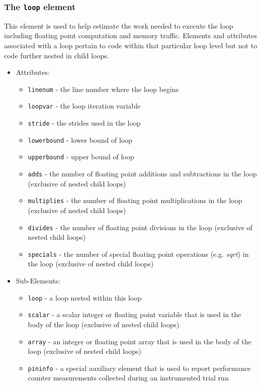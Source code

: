 \documentclass{article}
\begin{document}
\subsubsection{The {\tt loop} element}
  This element is used to help estimate the work needed to execute the
  loop including floating point computation and memory traffic.  Elements
  and attributes associated with a loop pertain to code within that
  particular loop level but not to code further nested in child loops.
  \begin{itemize}
    \item Attributes:
    \begin{itemize}
      \item {\tt linenum} - the line number where the loop begins
      \item {\tt loopvar} - the loop iteration variable
      \item {\tt stride} - the strides used in the loop
      \item {\tt lowerbound} - lower bound of loop
      \item {\tt upperbound} - upper bound of loop
      \item {\tt adds} - the number of floating point additions and
        subtractions in the loop (exclusive of nested child loops)
      \item {\tt multiplies} - the number of floating point
        multiplications in the loop (exclusive of nested child loops)
      \item {\tt divides} - the number of floating point divisions
        in the loop (exclusive of nested child loops)
      \item {\tt specials} - the number of special floating point
        operations (e.g. {\it sqrt}) in the loop (exclusive of nested
        child loops)
    \end{itemize}
    \item Sub-Elements:
    \begin{itemize}
      \item {\tt loop} - a loop nested within this loop
      \item {\tt scalar} - a scalar integer or floating point variable
        that is used in the body of the loop (exclusive of nested
        child loops)
      \item {\tt array} - an integer or floating point array that is
        used in the body of the loop (exclusive of nested child loops)
      \item {\tt pininfo} - a special auxiliary element that is used to
        report performance counter measurements collected during an
        instrumented trial run
    \end{itemize}
  \end{itemize}
\end{document}
